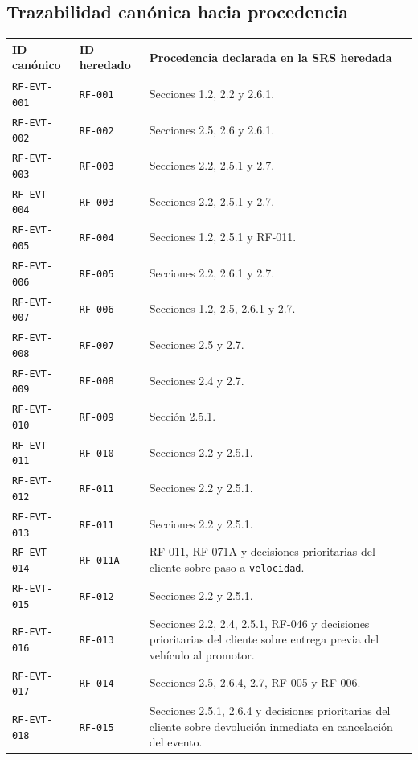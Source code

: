 \documentclass[10pt,letterpaper]{article}
\begin{document}
\subsection{Trazabilidad canónica hacia procedencia}
\begin{landscape}
\begin{longtable}{P{2.7cm}P{2.6cm}P{15.7cm}}
\toprule
\textbf{ID canónico} & \textbf{ID heredado} & \textbf{Procedencia declarada en la SRS heredada}\\
\midrule

\texttt{RF-EVT-001} & \texttt{RF-001} & Secciones 1.2, 2.2 y 2.6.1.\\
\texttt{RF-EVT-002} & \texttt{RF-002} & Secciones 2.5, 2.6 y 2.6.1.\\
\texttt{RF-EVT-003} & \texttt{RF-003} & Secciones 2.2, 2.5.1 y 2.7.\\
\texttt{RF-EVT-004} & \texttt{RF-003} & Secciones 2.2, 2.5.1 y 2.7.\\
\texttt{RF-EVT-005} & \texttt{RF-004} & Secciones 1.2, 2.5.1 y RF-011.\\
\texttt{RF-EVT-006} & \texttt{RF-005} & Secciones 2.2, 2.6.1 y 2.7.\\
\texttt{RF-EVT-007} & \texttt{RF-006} & Secciones 1.2, 2.5, 2.6.1 y 2.7.\\
\texttt{RF-EVT-008} & \texttt{RF-007} & Secciones 2.5 y 2.7.\\
\texttt{RF-EVT-009} & \texttt{RF-008} & Secciones 2.4 y 2.7.\\
\texttt{RF-EVT-010} & \texttt{RF-009} & Sección 2.5.1.\\
\texttt{RF-EVT-011} & \texttt{RF-010} & Secciones 2.2 y 2.5.1.\\
\texttt{RF-EVT-012} & \texttt{RF-011} & Secciones 2.2 y 2.5.1.\\
\texttt{RF-EVT-013} & \texttt{RF-011} & Secciones 2.2 y 2.5.1.\\
\texttt{RF-EVT-014} & \texttt{RF-011A} & RF-011, RF-071A y decisiones prioritarias del cliente sobre paso a \texttt{velocidad}.\\
\texttt{RF-EVT-015} & \texttt{RF-012} & Secciones 2.2 y 2.5.1.\\
\texttt{RF-EVT-016} & \texttt{RF-013} & Secciones 2.2, 2.4, 2.5.1, RF-046 y decisiones prioritarias del cliente sobre entrega previa del vehículo al promotor.\\
\texttt{RF-EVT-017} & \texttt{RF-014} & Secciones 2.5, 2.6.4, 2.7, RF-005 y RF-006.\\
\texttt{RF-EVT-018} & \texttt{RF-015} & Secciones 2.5.1, 2.6.4 y decisiones prioritarias del cliente sobre devolución inmediata en cancelación del evento.\\

\end{longtable}
\end{landscape}
\end{document}
